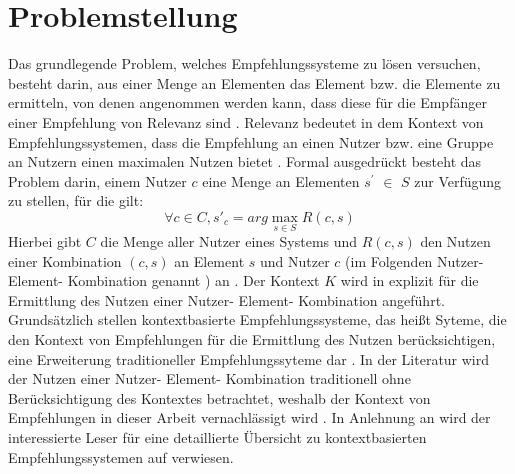 \section{Problemstellung}
\label{ch:empfehlungssysteme:problemstellung}
Das grundlegende Problem, welches Empfehlungssysteme zu lösen versuchen, besteht darin, aus einer Menge an Elementen das Element bzw. die Elemente zu ermitteln, von denen angenommen werden kann, dass diese für die Empfänger einer Empfehlung von Relevanz sind \cite[S. 734f.]{adomavicius:inproceedings}\cite[S. 76]{jannach:inproceedings}.
Relevanz bedeutet in dem Kontext von Empfehlungssystemen, dass die Empfehlung an einen Nutzer bzw. eine Gruppe an Nutzern einen maximalen Nutzen bietet \cite[S. 49]{adomavicius:inproceedings:2}\cite[S. 219]{lakiotaki:inproceedings}.
Formal ausgedrückt besteht das Problem darin, einem Nutzer $c$ eine Menge an Elementen $s^{'}$ $\in$ $S$ zur Verfügung zu stellen, für die gilt:
\begin{equation}\label{eq1}
    \forall c\in C,  s'_c = arg\max_{s \in S} R(c,s)
\end{equation}
Hierbei gibt $C$ die Menge aller Nutzer eines Systems und $R(c,s)$ den Nutzen einer Kombination $(c,s)$ an Element $s$ und Nutzer $c$ (im Folgenden Nutzer- Element- Kombination genannt \cite[S. 3]{recommenderSystems:2016}) an \cite[S. 734f.]{adomavicius:inproceedings}\cite[S. 219]{lakiotaki:inproceedings}.
Der Kontext $K$ wird in \textcite[S. 1]{klahold:book} explizit für die Ermittlung des Nutzen einer Nutzer- Element- Kombination angeführt.
Grundsätzlich stellen kontextbasierte Empfehlungssysteme, das heißt Syteme, die den Kontext von Empfehlungen für die Ermittlung des Nutzen berücksichtigen, eine Erweiterung traditioneller Empfehlungssyteme dar \cite[S. 744ff.]{adomavicius:inproceedings}.
In der Literatur wird der Nutzen einer Nutzer- Element- Kombination traditionell ohne Berücksichtigung des Kontextes betrachtet, weshalb der Kontext von Empfehlungen in dieser Arbeit vernachlässigt wird \cite[S. 734f.]{adomavicius:inproceedings}\cite[S. 219]{lakiotaki:inproceedings}\cite[S. 3]{jawaheer:article}.
In Anlehnung an \textcite[S. 3]{jawaheer:article} wird der interessierte Leser für eine detaillierte Übersicht zu kontextbasierten Empfehlungssystemen auf \textcite[S. 191ff]{adomavicius:3:inbook} verwiesen.

